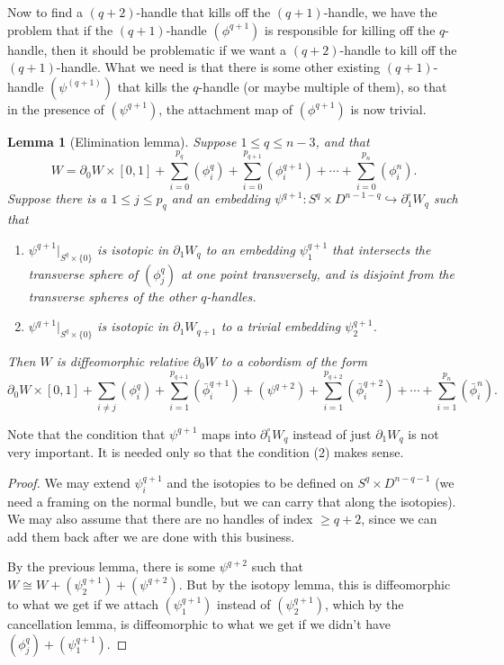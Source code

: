 \documentclass[a4paper, 12pt]{article}
\newtheorem{lemma}[thm]{Lemma}
\theoremstyle{definition}
\begin{document}
Now to find a $(q + 2)$-handle that kills off the $(q + 1)$-handle, we have the problem that if the $(q + 1)$-handle $(\phi^{q + 1})$ is responsible for killing off the $q$-handle, then it should be problematic if we want a $(q + 2)$-handle to kill off the $(q + 1)$-handle. What we need is that there is some other existing $(q + 1)$-handle $(\psi^{(q + 1)})$ that kills the $q$-handle (or maybe multiple of them), so that in the presence of $(\psi^{q + 1})$, the attachment map of $(\phi^{q + 1})$ is now trivial.
\begin{lemma}[Elimination lemma]
  Suppose $1 \leq q \leq n - 3$, and that
  \[
    W = \partial_0 W \times [0, 1] + \sum_{i = 0}^{p_q} (\phi_i^q) + \sum_{i = 0}^{p_{q + 1}} (\phi_i^{q + 1}) + \cdots + \sum_{i = 0}^{p_n} (\phi_i^n).
  \]
  Suppose there is a $1 \leq j \leq p_q$ and an embedding $\psi^{q + 1}: S^q \times D^{n - 1 - q}\hookrightarrow \partial_1^\circ W_q$ such that
  \begin{enumerate}
    \item $\psi^{q + 1}|_{S^q \times \{0\}}$ is isotopic in $\partial_1 W_q$ to an embedding $\psi_1^{q + 1}$ that intersects the transverse sphere of $(\phi_j^q)$ at one point transversely, and is disjoint from the transverse spheres of the other $q$-handles.
    \item $\psi^{q + 1}|_{S^q \times \{0\}}$ is isotopic in $\partial_1 W_{q + 1}$ to a trivial embedding $\psi_2^{q + 1}$.
  \end{enumerate}
  Then $W$ is diffeomorphic relative $\partial_0 W$ to a cobordism of the form
  \[
    \partial_0 W \times [0, 1] + \sum_{i \not= j} (\phi_i^q) + \sum_{i = 1}^{p_{q + 1}} (\bar{\phi}_i^{q + 1}) + (\psi^{q + 2}) + \sum_{i = 1}^{p_{q + 2}} (\bar{\phi}_i^{q + 2}) + \cdots + \sum_{i = 1}^{p_n}(\bar{\phi}_i^n).
  \]
\end{lemma}
Note that the condition that $\psi^{q + 1}$ maps into $\partial_1^\circ W_q$ instead of just $\partial_1 W_q$ is not very important. It is needed only so that the condition (2) makes sense.

\begin{proof}
  We may extend $\psi_i^{q + 1}$ and the isotopies to be defined on $S^q \times D^{n - q - 1}$ (we need a framing on the normal bundle, but we can carry that along the isotopies). We may also assume that there are no handles of index $\geq q + 2$, since we can add them back after we are done with this business.
  
  By the previous lemma, there is some $\psi^{q + 2}$ such that $W \cong W + (\psi_2^{q + 1}) + (\psi^{q + 2})$. But by the isotopy lemma, this is diffeomorphic to what we get if we attach $(\psi_1^{q + 1})$ instead of $(\psi_2^{q + 1})$, which by the cancellation lemma, is diffeomorphic to what we get if we didn't have $(\phi_j^q) + (\psi_1^{q + 1})$.
\end{proof}
\end{document}
